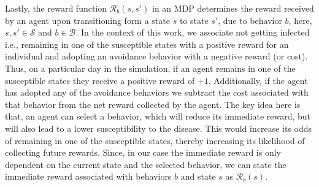 \documentclass[doublespace,draft]{VTthesis}
\begin{document}
    Lastly, the reward function $\mathcal{R}_b(s, s')$ in an MDP determines the reward received by an agent upon transitioning form a state $s$ to state $s'$, due to behavior $b$, here, $s, s' \in \mathcal{S}$ and $b \in \mathcal{B}$. In the context of this work, we associate not getting infected i.e., remaining in one of the susceptible states with a positive reward for an individual and adopting an avoidance behavior with a negative reward (or cost). Thus, on a particular day in the simulation, if an agent remains in one of the susceptible states they receive a positive reward of $+1$. Additionally, if the agent has adopted any of the avoidance behaviors we subtract the cost associated with that behavior from the net reward collected by the agent. The key idea here is that, an agent can select a behavior, which will reduce its immediate reward, but will also lead to a lower susceptibility to the disease. This would increase its odds of remaining in one of the susceptible states, 
    thereby increasing its likelihood of collecting future rewards. Since, in our case the immediate reward is only dependent on the current state and the selected behavior, we can state the immediate reward associated with behaviors $b$ and state $s$ as $\mathcal{R}_b(s)$.
\end{document}
